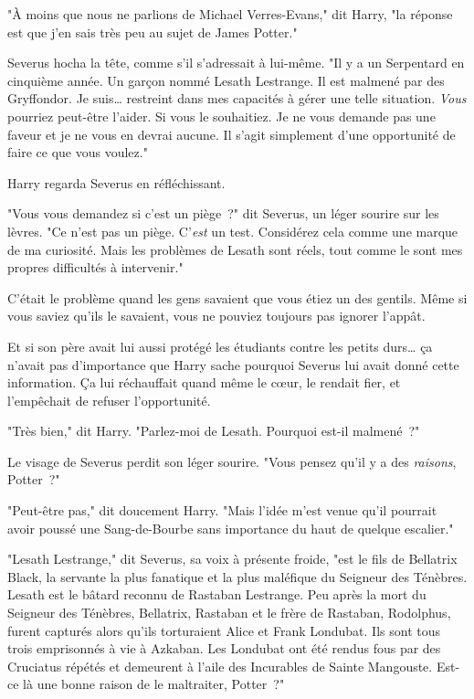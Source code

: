 "À moins que nous ne parlions de Michael Verres-Evans," dit Harry, "la réponse est que j'en sais très peu au sujet de James Potter."

Severus hocha la tête, comme s'il s'adressait à lui-même. "Il y a un Serpentard en cinquième année. Un garçon nommé Lesath Lestrange. Il est malmené par des Gryffondor. Je suis… restreint dans mes capacités à gérer une telle situation. \emph{Vous} pourriez peut-être l'aider. Si vous le souhaitiez. Je ne vous demande pas une faveur et je ne vous en devrai aucune. Il s'agit simplement d'une opportunité de faire ce que vous voulez."

Harry regarda Severus en réfléchissant.

"Vous vous demandez si c'est un piège~?" dit Severus, un léger sourire sur les lèvres. "Ce n'est pas un piège. C'\emph{est} un test. Considérez cela comme une marque de ma curiosité. Mais les problèmes de Lesath sont réels, tout comme le sont mes propres difficultés à intervenir."

C'était le problème quand les gens savaient que vous étiez un des gentils. Même si vous saviez qu'ils le savaient, vous ne pouviez toujours pas ignorer l'appât.

Et si son père avait lui aussi protégé les étudiants contre les petits durs… ça n'avait pas d'importance que Harry sache pourquoi Severus lui avait donné cette information. Ça lui réchauffait quand même le cœur, le rendait fier, et l'empêchait de refuser l'opportunité.

"Très bien," dit Harry. "Parlez-moi de Lesath. Pourquoi est-il malmené~?"

Le visage de Severus perdit son léger sourire. "Vous pensez qu'il y a des \emph{raisons}, Potter~?"

"Peut-être pas," dit doucement Harry. "Mais l'idée m'est venue qu'il pourrait avoir poussé une Sang-de-Bourbe sans importance du haut de quelque escalier."

"Lesath Lestrange," dit Severus, sa voix à présente froide, "est le fils de Bellatrix Black, la servante la plus fanatique et la plus maléfique du Seigneur des Ténèbres. Lesath est le bâtard reconnu de Rastaban Lestrange. Peu après la mort du Seigneur des Ténèbres, Bellatrix, Rastaban et le frère de Rastaban, Rodolphus, furent capturés alors qu'ils torturaient Alice et Frank Londubat. Ils sont tous trois emprisonnés à vie à Azkaban. Les Londubat ont été rendus fous par des Cruciatus répétés et demeurent à l'aile des Incurables de Sainte Mangouste. Est-ce là une bonne raison de le maltraiter, Potter~?"

